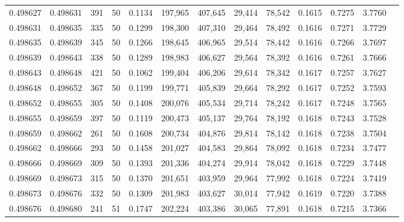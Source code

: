 \begin{tabular}{rrrrrrrrrrrrr}
0.498627 & 0.498631 & 391 &  50 &                                     0.1134 & 197,965 & 407,645 &  29,414 &  78,542 & 0.1615 & 0.7275 & 3.7760 \\
0.498631 & 0.498635 & 335 &  50 &                                     0.1299 & 198,300 & 407,310 &  29,464 &  78,492 & 0.1616 & 0.7271 & 3.7729 \\
0.498635 & 0.498639 & 345 &  50 &                                     0.1266 & 198,645 & 406,965 &  29,514 &  78,442 & 0.1616 & 0.7266 & 3.7697 \\
0.498639 & 0.498643 & 338 &  50 &                                     0.1289 & 198,983 & 406,627 &  29,564 &  78,392 & 0.1616 & 0.7261 & 3.7666 \\
0.498643 & 0.498648 & 421 &  50 &                                     0.1062 & 199,404 & 406,206 &  29,614 &  78,342 & 0.1617 & 0.7257 & 3.7627 \\
0.498648 & 0.498652 & 367 &  50 &                                     0.1199 & 199,771 & 405,839 &  29,664 &  78,292 & 0.1617 & 0.7252 & 3.7593 \\
0.498652 & 0.498655 & 305 &  50 &                                     0.1408 & 200,076 & 405,534 &  29,714 &  78,242 & 0.1617 & 0.7248 & 3.7565 \\
0.498655 & 0.498659 & 397 &  50 &                                     0.1119 & 200,473 & 405,137 &  29,764 &  78,192 & 0.1618 & 0.7243 & 3.7528 \\
0.498659 & 0.498662 & 261 &  50 &                                     0.1608 & 200,734 & 404,876 &  29,814 &  78,142 & 0.1618 & 0.7238 & 3.7504 \\
0.498662 & 0.498666 & 293 &  50 &                                     0.1458 & 201,027 & 404,583 &  29,864 &  78,092 & 0.1618 & 0.7234 & 3.7477 \\
0.498666 & 0.498669 & 309 &  50 &                                     0.1393 & 201,336 & 404,274 &  29,914 &  78,042 & 0.1618 & 0.7229 & 3.7448 \\
0.498669 & 0.498673 & 315 &  50 &                                     0.1370 & 201,651 & 403,959 &  29,964 &  77,992 & 0.1618 & 0.7224 & 3.7419 \\
0.498673 & 0.498676 & 332 &  50 &                                     0.1309 & 201,983 & 403,627 &  30,014 &  77,942 & 0.1619 & 0.7220 & 3.7388 \\
0.498676 & 0.498680 & 241 &  51 &                                     0.1747 & 202,224 & 403,386 &  30,065 &  77,891 & 0.1618 & 0.7215 & 3.7366 \\

\end{tabular}
